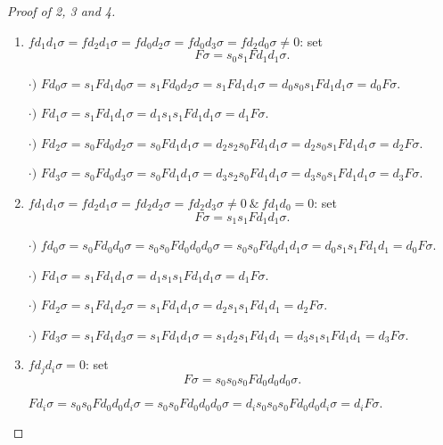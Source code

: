 \documentclass[main.tex]{subfiles}
\begin{document}
\begin{proof}[Proof of 2, 3 and 4]
\begin{enumerate}[a)]
\begin{enumerate}[{iv}-a.]
            \item\underline{$fd_1d_1\sigma=fd_2d_1\sigma=fd_0d_2\sigma=fd_0d_3\sigma=fd_2d_0\sigma\neq0$}: set $$F\sigma=s_0s_1Fd_1d_1\sigma.$$

            $\cdot)$ $Fd_0\sigma=s_1Fd_1d_0\sigma=s_1Fd_0d_2\sigma=s_1Fd_1d_1\sigma=d_0s_0s_1Fd_1d_1\sigma=d_0F\sigma.$

            $\cdot)$ $Fd_1\sigma=s_1Fd_1d_1\sigma=d_1s_1s_1Fd_1d_1\sigma=d_1F\sigma$.

            $\cdot)$ $Fd_2\sigma=s_0Fd_0d_2\sigma=s_0Fd_1d_1\sigma=d_2s_2s_0Fd_1d_1\sigma=d_2s_0s_1Fd_1d_1\sigma=d_2F\sigma.$

            $\cdot)$ $Fd_3\sigma=s_0Fd_0d_3\sigma=s_0Fd_1d_1\sigma=d_3s_2s_0Fd_1d_1\sigma=d_3s_0s_1Fd_1d_1\sigma=d_3F\sigma.$

            \item\underline{$fd_1d_1\sigma=fd_2d_1\sigma=fd_2d_2\sigma=fd_2d_3\sigma\neq0\ \&\ fd_1d_0=0$}: set $$F\sigma=s_1s_1Fd_1d_1\sigma.$$

            $\cdot)$ $fd_0\sigma=s_0Fd_0d_0\sigma=s_0s_0Fd_0d_0d_0\sigma=s_0s_0Fd_0d_1d_1\sigma=d_0s_1s_1Fd_1d_1=d_0F\sigma$.

            $\cdot)$ $Fd_1\sigma=s_1Fd_1d_1\sigma=d_1s_1s_1Fd_1d_1\sigma=d_1F\sigma.$

            $\cdot)$ $Fd_2\sigma=s_1Fd_1d_2\sigma=s_1Fd_1d_1\sigma=d_2s_1s_1Fd_1d_1=d_2F\sigma.$

            $\cdot)$ $Fd_3\sigma=s_1Fd_1d_3\sigma=s_1Fd_1d_1\sigma=s_1d_2s_1Fd_1d_1=d_3s_1s_1Fd_1d_1=d_3F\sigma.$

            \item\underline{$fd_jd_i\sigma=0$}: set $$F\sigma=s_0s_0s_0Fd_0d_0d_0\sigma.$$

            $Fd_i\sigma=s_0s_0Fd_0d_0d_i\sigma=s_0s_0Fd_0d_0d_0\sigma=d_is_0s_0s_0Fd_0d_0d_i\sigma=d_iF\sigma.$

            \end{enumerate}

    \end{enumerate}
\end{proof}
\end{document}
